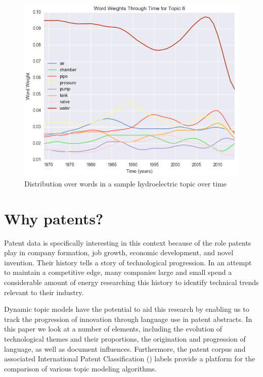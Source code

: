 \begin{figure}[ht]
\centering
\includegraphics[width=130mm,scale=0.45]{Figures/wwttTopic6}
\decoRule
\caption[wwttTopic6]{Distribution over words in a sample hydroelectric topic over time}
\label{fig:wwttTopic6}
\end{figure}


\section{Why patents?}
Patent data is specifically interesting in this context because of the role patents play in company formation, job growth, economic development, and novel invention. Their history tells a story of technological progression. In an attempt to maintain a competitive edge, many companies large and small spend a considerable amount of energy researching this history to identify technical trends relevant to their industry. 

Dynamic topic models have the potential to aid this research by enabling us to track the progression of innovation through language use in patent abstracts. In this paper we look at a number of elements, including the evolution of technological themes and their proportions, the origination and progression of language, as well as document influences. Furthermore, the patent corpus and associated International Patent Classification () labels provide a platform for the comparison of various topic modeling algorithms.

